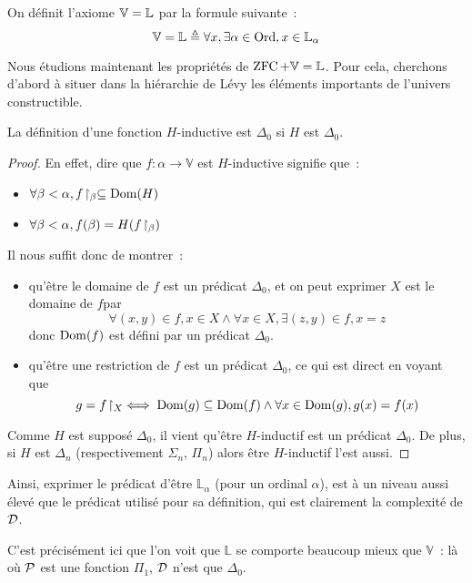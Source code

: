 \begin{axiom}[V = L]\label{ax.VeqL}
  On définit l'axiome $\mathbb V = \mathbb L$ par la formule suivante~:
  \[\mathbb V = \mathbb L \triangleq \forall x, \exists \alpha \in \operatorname{Ord}, x \in \mathbb L_\alpha\]
\end{axiom}

Nous étudions maintenant les propriétés de $\operatorname{ZFC}+\mathbb V = \mathbb L$. Pour cela, cherchons
d'abord à situer dans la hiérarchie de Lévy les éléments importants de l'univers
constructible.

\begin{property}
  La définition d'une fonction $H$-inductive est $\Delta_0$ si $H$ est
  $\Delta_0$.
\end{property}

\begin{proof}
  En effet, dire que $f : \alpha \to \mathbb V$ est $H$-inductive signifie que~:
  \begin{itemize}
  \item $\forall \beta < \alpha, f\!\upharpoonright_{\beta}\subseteq \operatorname{Dom}(H)$
  \item $\forall \beta < \alpha, f(\beta) = H(f\!\upharpoonright_{\beta})$
  \end{itemize}
  Il nous suffit donc de montrer~:
  \begin{itemize}
  \item qu'être le domaine de $f$ est un prédicat $\Delta_0$, et on peut
    exprimer \og $X$ est le domaine de $f$\fg par
    \[\forall (x,y)\in f, x\in X \land \forall x \in X, \exists (z,y)\in f,
    x = z\]
    donc $\operatorname{Dom}(f)$ est défini par un prédicat $\Delta_0$.
  \item qu'être une restriction de $f$ est un prédicat $\Delta_0$, ce qui est
    direct en voyant que
    \[g = f\!\upharpoonright_{X} \iff \operatorname{Dom}(g)\subseteq\operatorname{Dom}(f)\land
    \forall x \in \operatorname{Dom}(g), g(x)=f(x)\]
  \end{itemize}
  Comme $H$ est supposé $\Delta_0$, il vient qu'être $H$-inductif est un
  prédicat $\Delta_0$. De plus, si $H$ est $\Delta_n$ (respectivement
  $\Sigma_n$, $\Pi_n$) alors être $H$-inductif l'est aussi.
\end{proof}

Ainsi, exprimer le prédicat d'être $\mathbb L_\alpha$ (pour un ordinal $\alpha$),
est à un niveau aussi élevé que le prédicat utilisé pour sa définition, qui est
clairement la complexité de $\mathcal{D}$.

C'est précisément ici que l'on voit que $\mathbb L$ se comporte beaucoup mieux
que $\mathbb V$~: là où $\mathcal{P}$ est une fonction $\Pi_1$, $\mathcal{D}$ n'est
que $\Delta_0$.

